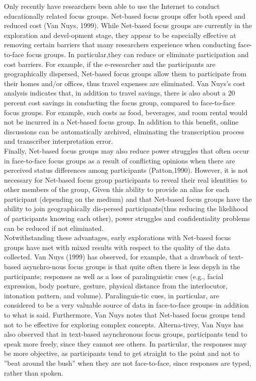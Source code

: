 \documentclass{book}
\begin{document}
\vspace*{0.3cm}
Only recently have researchers been able to use the Internet to conduct educationally related focus groups. Net-based focus groups offer both speed and reduced cost (Van Nuys, 1999). While Net-based focus groups are currently in the exploration and devel-opment stage, they appear to be eapecially effective at removing certain barriers that many researchers experience when conducting face-to-face focus groups. In particular,they can reduce or eliminate participation and cost barriers. For example, if the e-researcher and the participants are geographically dispersed, Net-based focus groups allow them to participate from their homes and/or offices, thus travel expenses are eliminated. Van Nuys's cost analysis indicates that, in addition to travel savings, there is also about a 20 percent cost savings in conducting the focus group, compared to face-to-face focus groups. For example, such costs as food, beverages, and room rental would not be incurred in a Net-based focus group. In addition to this benefit, online discussions can be automatically archived, eliminating the transcription process and transcriber interpretation error.\\
\hspace*{0.5cm} Finally, Net-based focus groups may also reduce power struggles that often occur in face-to-face focus groups as a result of conflicting opinions when there are perceived status differences among participants (Patton,1990). However, it is not necessary for Net-based focus group participants to reveal their real identities to other members of the group, Given this ability to provide an alias for each participant (depending on the medium) and that Net-based focus groups have the ability to join geographically dis-persed participants(thus reducing the likelihood of participants knowing each other), power struggles and confidentiality problems can be reduced if not eliminated.\\
\hspace*{0.5cm} Notwithstanding these advantages, early explorations with Net-based focus groups have met with mixed results with respect to the quality of the data collected. Van Nuys (1999) has observed, for example, that a drawback of text-based asynchro-nous focus groups is that quite often there is less depyh in the participants; responses as well as a loss of paralinguistic cues (e.g., facial expression, body posture, gesture, physical distance from the interlocutor, intonation pattern, and volume). Paralinguis-tic cues, in particular, are considered to be a very valuable source of data in face-to-face groups--in addition to what is said. Furthermore, Van Nuys notes that Net-based focus groups tend not to be effective for exploring complex concepts. Alterna-tivey, Van Nuys has also observed that in text-based asynchronous focus groups, participants tend to speak more freely, since they cannot see others. In particular, the responses may be more objective, as participants tend to get straight to the point and not to ''beat around the bush'' when they are not face-to-face, since responses are typed, rather than spoken.\\
\end{document}
